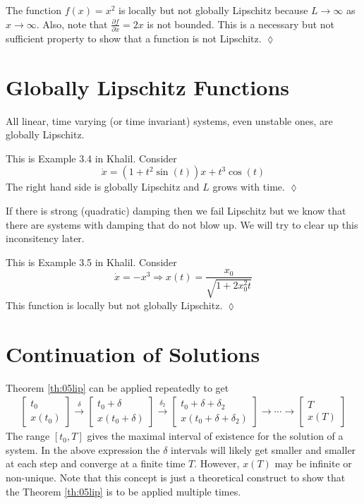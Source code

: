 \begin{example}
The function $f(x) = x^2$ is locally but not globally Lipschitz because $L\to\infty$ as $x\to\infty$. Also, note that $\frac{\partial f}{\partial x} = 2x$ is not bounded. This is a necessary but not sufficient property to show that a function is not Lipschitz.
$\lozenge$
\end{example}

\section{Globally Lipschitz Functions}
All linear, time varying (or time invariant) systems, even unstable ones, are globally Lipschitz.

\begin{example}
This is Example 3.4 in Khalil. Consider
$$\dot{x} = (1+t^2\sin(t))x + t^3\cos(t)$$
The right hand side is globally Lipschitz and $L$ grows with time.
$\lozenge$
\end{example}

If there is strong (quadratic) damping then we fail Lipschitz but we know that there are systems with damping that do not blow up. We will try to clear up this inconsitency later.

\begin{example}
This is Example 3.5 in Khalil. Consider
$$\dot{x} = -x^3 \Rightarrow x(t) = \frac{x_0}{\sqrt{1+2x_0^2t}}$$
This function is locally but not globally Lipschitz.
$\lozenge$
\end{example}

\section{Continuation of Solutions}
Theorem \ref{th:05lip} can be applied repeatedly to get
\begin{align*}
\left[\begin{array}{c} t_0 \\ x(t_0) \end{array}\right] \xrightarrow{\delta}
\left[\begin{array}{c} t_0+\delta \\ x(t_0+\delta) \end{array}\right] \xrightarrow{\delta_2}
\left[\begin{array}{c} t_0+\delta+\delta_2 \\ x(t_0+\delta+\delta_2) \end{array}\right] \rightarrow
\cdots \rightarrow
\left[\begin{array}{c} T \\ x(T) \end{array}\right]
\end{align*}
The range $[t_0, T]$ gives the maximal interval of existence for the solution of a system. In the above expression the $\delta$ intervals will likely get smaller and smaller at each step and converge at a finite time $T$. However, $x(T)$ may be infinite or non-unique. Note that this concept is just a theoretical construct to show that the Theorem \ref{th:05lip} is to be applied multiple times.

